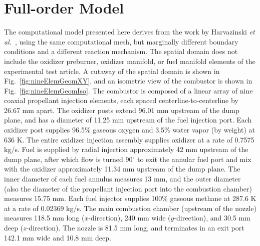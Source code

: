 \section{Full-order Model}
%
The computational model presented here derives from the work by Harvazinski \textit{et al.}~\cite{Harvazinski2019}, using the same computational mesh, but marginally different boundary conditions and a different reaction mechanism. The spatial domain does not include the oxidizer preburner, oxidizer manifold, or fuel manifold elements of the experimental test article. A cutaway of the spatial domain is shown in Fig.~\ref{fig:nineElemGeomXY}, and an isometric view of the combustor is shown in Fig.~\ref{fig:nineElemGeomIso}. The combustor is composed of a linear array of nine coaxial propellant injection elements, each spaced centerline-to-centerline by 26.67 mm apart. The oxidizer posts extend 96.01 mm upstream of the dump plane, and has a diameter of 11.25 mm upstream of the fuel injection port. Each oxidizer post supplies 96.5\% gaseous oxygen and 3.5\% water vapor (by weight) at 636 K. The entire oxidizer injection assembly supplies oxidizer at a rate of 0.7575 kg/s. Fuel is supplied by radial injection approximately 42 mm upstream of the dump plane, after which flow is turned 90$^{\circ}$ to exit the annular fuel port and mix with the oxidizer approximately 11.34 mm upstream of the dump plane. The inner diameter of each fuel annulus measures 13 mm, and the outer diameter (also the diameter of the propellant injection port into the combustion chamber) measures 15.75 mm. Each fuel injector supplies 100\% gaseous methane at 287.6 K at a rate of 0.02369 kg/s. The main combustion chamber (upstream of the nozzle) measures 118.5 mm long ($x$-direction), 240 mm wide ($y$-direction), and 30.5 mm deep ($z$-direction). The nozzle is 81.5 mm long, and terminates in an exit port 142.1 mm wide and 10.8 mm deep.



